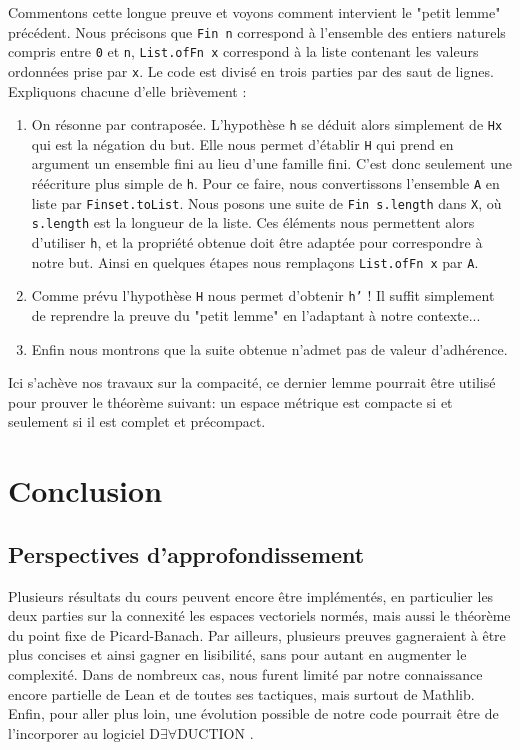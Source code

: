 \documentclass[a4paper, 12pt]{article}
\newcommand{\lean}[1]{\texttt{#1}}
\begin{document}
\begin{itemize}
Commentons cette longue preuve et voyons comment intervient le "petit lemme" précédent. Nous précisons que \lean{Fin n} correspond à l'ensemble des entiers naturels compris entre \lean{0} et \lean{n}, \lean{List.ofFn x} correspond à la liste contenant les valeurs ordonnées prise par \lean{x}. Le code est divisé en trois parties par des saut de lignes. Expliquons chacune d'elle brièvement :

\begin{enumerate}
    \item On résonne par contraposée. L'hypothèse \lean{h} se déduit alors simplement de \lean{Hx} qui est la négation du but. Elle nous permet d'établir \lean{H} qui prend en argument un ensemble fini au lieu d'une famille fini. C'est donc seulement une réécriture plus simple de \lean{h}. Pour ce faire, nous convertissons l'ensemble \lean{A} en liste par \lean{Finset.toList}. Nous posons une suite de \lean{Fin s.length} dans \lean{X}, où \lean{s.length} est la longueur de la liste. Ces éléments nous permettent alors d'utiliser \lean{h}, et la propriété obtenue doit être adaptée pour correspondre à notre but. Ainsi en quelques étapes nous remplaçons \lean{List.ofFn x} par \lean{A}.
    \item Comme prévu l'hypothèse \lean{H} nous permet d'obtenir \lean{h'} ! Il suffit simplement de reprendre la preuve du "petit lemme" en l'adaptant à notre contexte...
    \item Enfin nous montrons que la suite obtenue n'admet pas de valeur d'adhérence.
\end{enumerate}

Ici s'achève nos travaux sur la compacité, ce dernier lemme pourrait être utilisé pour prouver le théorème suivant: un espace métrique est compacte si et seulement si il est complet et précompact.

\newpage
\section{Conclusion}

\subsection{Perspectives d’approfondissement}

Plusieurs résultats du cours peuvent encore être implémentés, en particulier les deux parties sur la connexité les espaces vectoriels normés, mais aussi le théorème du point fixe de Picard-Banach. Par ailleurs, plusieurs preuves gagneraient à être plus concises et ainsi gagner en lisibilité, sans pour autant en augmenter le complexité. Dans de nombreux cas, nous furent limité par notre connaissance encore partielle de Lean et de toutes ses tactiques, mais surtout de Mathlib. Enfin, pour aller plus loin, une évolution possible de notre code pourrait être de l'incorporer au logiciel D$\exists\forall$DUCTION \cite{deaduction}.



\end{itemize}
\end{document}
